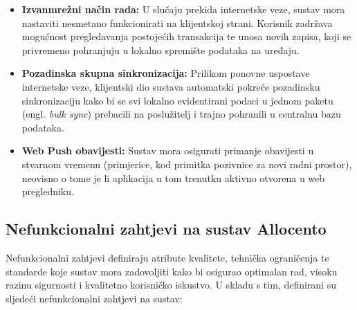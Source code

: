 \documentclass[a4paper,12pt,oneside]{article}
\begin{document}
\begin{itemize}
		\item \textbf{Izvanmrežni način rada:} U slučaju prekida internetske veze, sustav mora nastaviti nesmetano funkcionirati na klijentskoj strani. Korisnik zadržava mogućnost pregledavanja postojećih transakcija te unosa novih zapisa, koji se privremeno pohranjuju u lokalno spremište podataka na uređaju.
		
		\item \textbf{Pozadinska skupna sinkronizacija:} Prilikom ponovne uspostave internetske veze, klijentski dio sustava automatski pokreće pozadinsku sinkronizaciju kako bi se svi lokalno evidentirani podaci u jednom paketu (engl. \textit{bulk sync}) prebacili na poslužitelj i trajno pohranili u centralnu bazu podataka.
		
		\item \textbf{Web Push obavijesti:} Sustav mora osigurati primanje obavijesti u stvarnom vremenu (primjerice, kod primitka pozivnice za novi radni prostor), neovisno o tome je li aplikacija u tom trenutku aktivno otvorena u web pregledniku.
	\end{itemize}
	
	\subsection{Nefunkcionalni zahtjevi na sustav Allocento}
	
	Nefunkcionalni zahtjevi definiraju atribute kvalitete, tehnička ograničenja te standarde koje sustav mora zadovoljiti kako bi osigurao optimalan rad, visoku razinu sigurnosti i kvalitetno korisničko iskustvo. U skladu s tim, definirani su sljedeći nefunkcionalni zahtjevi na sustav:
	
\end{document}
